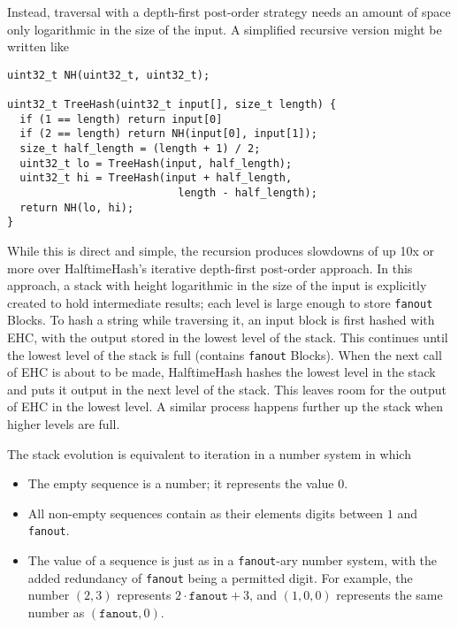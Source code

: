 \documentclass[sigconf, nonacm]{acmart}
\begin{document}
Instead, traversal with a depth-first post-order strategy needs an amount of space only logarithmic in the size of the input.
A simplified recursive version might be written like

\begin{lstlisting}
uint32_t NH(uint32_t, uint32_t);

uint32_t TreeHash(uint32_t input[], size_t length) {
  if (1 == length) return input[0]
  if (2 == length) return NH(input[0], input[1]);
  size_t half_length = (length + 1) / 2;
  uint32_t lo = TreeHash(input, half_length);
  uint32_t hi = TreeHash(input + half_length,
                           length - half_length);
  return NH(lo, hi);
}
\end{lstlisting}

While this is direct and simple, the recursion produces slowdowns of up 10x or more over HalftimeHash's iterative depth-first post-order approach.
In this approach, a stack with height logarithmic in the size of the input is explicitly created to hold intermediate results; each level is large enough to store \texttt{fanout} Blocks.
To hash a string while traversing it, an input block is first hashed with EHC, with the output stored in the lowest level of the stack.
This continues until the lowest level of the stack is full (contains \texttt{fanout} Blocks).
When the next call of EHC is about to be made, HalftimeHash hashes the lowest level in the stack and puts it output in the next level of the stack.
This leaves room for the output of EHC in the lowest level.
A similar process happens further up the stack when higher levels are full.

The stack evolution is equivalent to iteration in a number system in which

\begin{itemize}
\item The empty sequence is a number; it represents the value $0$.
\item All non-empty sequences contain as their elements digits between $1$ and \texttt{fanout}.
\item The value of a sequence is just as in a \texttt{fanout}-ary number system, with the added redundancy of \texttt{fanout} being a permitted digit.
  For example, the number $(2,3)$ represents $2\cdot\texttt{fanout} + 3$, and $(1,0,0)$ represents the same number as $(\texttt{fanout},0)$.
\end{itemize}

\end{document}
